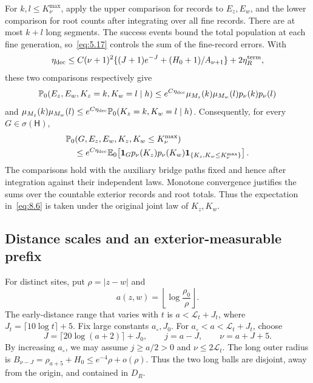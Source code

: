 \documentclass[11pt,a4paper]{article}
\numberwithin{equation}{section}
\theoremstyle{remark}
\begin{document}
For $k,l\le K_\nu^{\max}$, apply the upper comparison for records to $E_z,E_w$, and the lower comparison for root counts after integrating over all fine records. There are at most $k+l$ long segments. The success events bound the total population at each fine generation, so~\eqref{eq:5.17} controls the sum of the fine-record errors. With
\begin{equation}\label{eq:8.5}
 \eta_{\rm dec}\le C(\nu+1)^2
 \{(J+1)e^{-J}+(H_0+1)/A_{\nu+1}\}+2\eta_R^{\rm term},
\end{equation}
these two comparisons respectively give
\[
 \mathbb P_0(E_z,E_w,K_z=k,K_w=l\mid h)
 \le e^{C\eta_{\rm dec}}\mu_{M_z}(k)\mu_{M_w}(l)p_\nu(k)p_\nu(l)
\]
and $\mu_{M_z}(k)\mu_{M_w}(l)\le e^{C\eta_{\rm dec}}\mathbb P_0(K_z=k,K_w=l\mid h)$.
Consequently, for every $G\in\sigma(\mathsf H)$,
\begin{equation}\label{eq:8.6}
\begin{split}
 &\mathbb P_0(G,E_z,E_w,K_z,K_w\le K_\nu^{\max})\\
 &\quad\le e^{C\eta_{\rm dec}}\mathbb E_0\!\left[
 \mathbf1_Gp_\nu(K_z)p_\nu(K_w)
 \mathbf1_{\{K_z,K_w\le K_\nu^{\max}\}}\right].
\end{split}
\end{equation}
The comparisons hold with the auxiliary bridge paths fixed and hence after integration against their independent laws. Monotone convergence justifies the sums over the countable exterior records and root totals. Thus the expectation in~\eqref{eq:8.6} is taken under the original joint law of $K_z,K_w$.

\subsection{Distance scales and an exterior-measurable prefix}\label{sec:earlygeometry}
For distinct sites, put $\rho=|z-w|$ and
\begin{equation}\label{eq:8.7}
a(z,w)=\left\lfloor\log\frac{\rho_0}{\rho}\right\rfloor.
\end{equation}
The early-distance range that varies with $t$ is $a<\mathcal L_t+J_t$, where
$J_t=\lceil10\log t\rceil+5$. Fix large constants $a_\circ,J_0$. For
$a_\circ<a<\mathcal L_t+J_t$, choose
\begin{equation}\label{eq:8.8}
J=\lceil20\log(a+2)\rceil+J_0,\qquad
j=a-J,\qquad \nu=a+J+5.
\end{equation}
By increasing $a_\circ$, we may assume $j\ge a/2>0$ and $\nu\le2\mathcal L_t$. The long outer radius is
$B_{\nu-J}=\rho_{a+5}+H_0\le e^{-4}\rho+o(\rho)$.
Thus the two long balls are disjoint, away from the origin, and contained in $D_R$.
\end{document}
